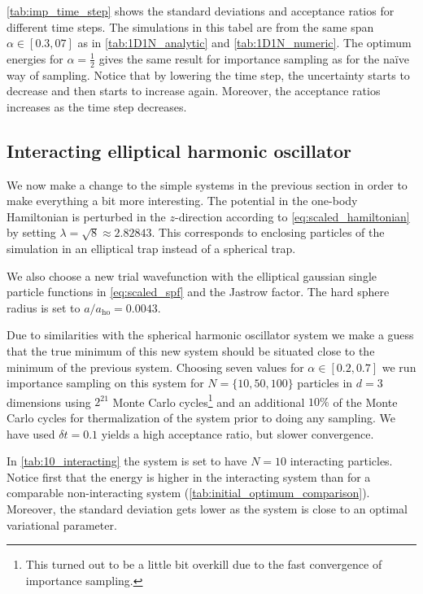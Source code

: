 \documentclass[
    a4paper, aps, twocolumn, floatfix, superscriptaddress, nofootinbib]{revtex4-1}
\newcommand{\1}{\mathds{1}}
\begin{document}
            \autoref{tab:imp_time_step} shows the standard deviations and
            acceptance ratios for different time steps. The simulations in this
            tabel are from the same span $\alpha \in [0.3, 07]$ as in
            \autoref{tab:1D1N_analytic} and \autoref{tab:1D1N_numeric}. The
            optimum energies for $\alpha = \frac{1}{2}$ gives the same result
            for importance sampling as for the naïve way of sampling. Notice
            that by lowering the time step, the uncertainty starts to decrease
            and then starts to increase again. Moreover, the acceptance ratios
            increases as the time step decreases.

    \subsection{Interacting elliptical harmonic oscillator}
        We now make a change to the simple systems in the previous section in
        order to make everything a bit more interesting. The potential in the
        one-body Hamiltonian is perturbed in the $z$-direction according to
        \autoref{eq:scaled_hamiltonian} by setting $\lambda = \sqrt{8} \approx
        2.82843$. This corresponds to enclosing particles of the simulation in
        an elliptical trap instead of a spherical trap.

        We also choose a new trial wavefunction with the elliptical gaussian
        single particle functions in \autoref{eq:scaled_spf} and the Jastrow
        factor. The hard sphere radius is set to $a/a_{\text{ho}} = 0.0043$.

        Due to similarities with the spherical harmonic oscillator
        system we make a guess that the true minimum of this new system should
        be situated close to the minimum of the previous system. Choosing seven
        values for $\alpha \in [0.2, 0.7]$ we run importance sampling on this
        system for $N = \{10, 50, 100\}$ particles in $d = 3$ dimensions using
        $2^{21}$ Monte Carlo cycles\footnote{This turned out to be a little bit
        overkill due to the fast convergence of importance sampling.} and an
        additional $10\%$ of the Monte Carlo cycles for thermalization of the
        system prior to doing any sampling. We have used $\delta t = 0.1$ yields
        a high acceptance ratio, but slower convergence.

        In \autoref{tab:10_interacting} the system is set to have $N = 10$
        interacting particles. Notice first that the energy is higher in
        the interacting system than for a comparable non-interacting system
        (\autoref{tab:initial_optimum_comparison}).  Moreover, the standard
        deviation gets lower as the system is close to an optimal variational
        parameter.
\end{document}
